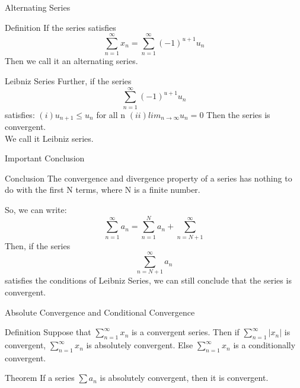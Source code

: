 \begin{frame}{Alternating Series}
    \begin{block}{Definition}
        If the series satisfies
        $$\sum\limits_{n=1}^{\infty}x_n=\sum\limits_{n=1}^{\infty}(-1)^{u+1} u_n$$
        Then we call it an alternating series.
    \end{block}
\end{frame}



\begin{frame}{Leibniz Series}
    Further, if the series
    $$\sum\limits_{n=1}^{\infty}(-1)^{u+1} u_n$$
    satisfies:
    $(i) u_{n+1} \leqslant u_n$ for all n
    $(ii) lim_{n\rightarrow \infty}u_n=0$
    Then the series is convergent. \\
    We call it Leibniz series.
\end{frame}



\begin{frame}{Important Conclusion}
    \begin{block}{Conclusion}
        The convergence and divergence property of a series has nothing to do with the first N terms, where N is a finite number.
    \end{block}
    So, we can write:
    $$\sum_{n=1}^{\infty}a_n= \sum_{n=1}^{N} a_n+ \sum _{n=N+1}^{\infty}$$
    Then, if the series
    $$\sum_{n=N+1}^{\infty} a_n$$
    satisfies the conditions of Leibniz Series, we can still conclude that the series is convergent.
\end{frame}



\begin{frame}{Absolute Convergence and Conditional Convergence}
    \begin{block}{Definition}
        Suppose that $\sum\limits_{n=1}^{\infty} x_n$ is a convergent series. Then if $\sum\limits_{n=1}^{\infty} |x_n|$ is convergent, $\sum\limits_{n=1}^{\infty} x_n$ is absolutely convergent. Else $\sum\limits_{n=1}^{\infty} x_n$ is a conditionally convergent.
    \end{block}
    \begin{block}{Theorem}
        If a series $\sum a_n$ is absolutely convergent, then it is convergent.
    \end{block}
\end{frame}



